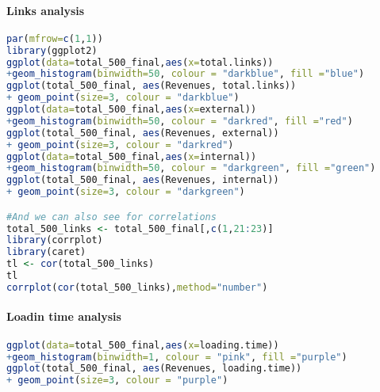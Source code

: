 \documentclass{article}
\begin{document}
\paragraph{Links analysis}\label{r: van: l}
\begin{lstlisting}[language=R] 
par(mfrow=c(1,1))
library(ggplot2)
ggplot(data=total_500_final,aes(x=total.links))
+geom_histogram(binwidth=50, colour = "darkblue", fill ="blue")
ggplot(total_500_final, aes(Revenues, total.links)) 
+ geom_point(size=3, colour = "darkblue")
ggplot(data=total_500_final,aes(x=external))
+geom_histogram(binwidth=50, colour = "darkred", fill ="red")
ggplot(total_500_final, aes(Revenues, external)) 
+ geom_point(size=3, colour = "darkred")
ggplot(data=total_500_final,aes(x=internal))
+geom_histogram(binwidth=50, colour = "darkgreen", fill ="green")
ggplot(total_500_final, aes(Revenues, internal)) 
+ geom_point(size=3, colour = "darkgreen")

#And we can also see for correlations
total_500_links <- total_500_final[,c(1,21:23)]
library(corrplot)
library(caret)
tl <- cor(total_500_links)
tl
corrplot(cor(total_500_links),method="number")

 \end{lstlisting}
 
 
\paragraph{Loadin time analysis}\label{r: van: load}
\begin{lstlisting}[language=R] 
ggplot(data=total_500_final,aes(x=loading.time))
+geom_histogram(binwidth=1, colour = "pink", fill ="purple")
ggplot(total_500_final, aes(Revenues, loading.time)) 
+ geom_point(size=3, colour = "purple")
 \end{lstlisting}
\end{document}

